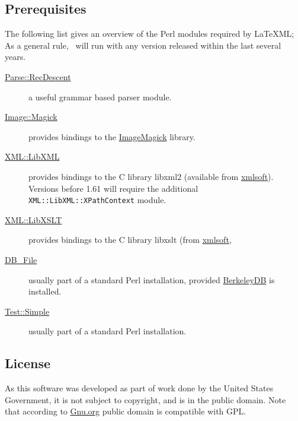\documentclass{article}
\begin{document}
\subsection{Prerequisites}\label{prerequisites}
The following list gives an overview of the Perl modules required by LaTeXML;
As a general rule, \LaTeXML\ will run with any version released within
the last several years.
\begin{description}
\item[\href{http://search.cpan.org/search?query=Parse::RecDescent&mode=module}{Parse::RecDescent}]
    a useful grammar based parser module.
\item[\href{http://search.cpan.org/search?query=Image::Magick&mode=module}{Image::Magick}]
    provides bindings to the \href{http://www.imagemagick.org/}{ImageMagick} library.
\item[\href{http://search.cpan.org/search?query=XML::LibXML&mode=module}{XML::LibXML}]
    provides bindings to the C library libxml2
    (available from \href{http://www.xmlsoft.org}{xmlsoft}).
    Versions before 1.61 will require the additional \texttt{XML::LibXML::XPathContext} module.
\item[\href{http://search.cpan.org/search?query=XML::LibXSLT&mode=module}{XML::LibXSLT}]
    provides bindings to the C library libxslt
    (from \href{http://www.xmlsoft.org}{xmlsoft},
\item[\href{http://search.cpan.org/search?query=DB_File&mode=module}{DB\_File}]
    usually part of a standard Perl installation, provided
    \href{http://www.sleepycat.com}{BerkeleyDB} is installed.
\item[\href{http://search.cpan.org/search?query=Test::Simple&mode=module}{Test::Simple}]
    usually part of a standard Perl installation.
\end{description}

\subsection{License}\label{license}
As this software was developed as part of work done by the
United States Government, it is not subject to copyright,
and is in the public domain.
Note that according to
\href{http://www.gnu.org/licences/license-list.html#PublicDomain}{Gnu.org}
public domain is compatible with GPL.
\end{document}

